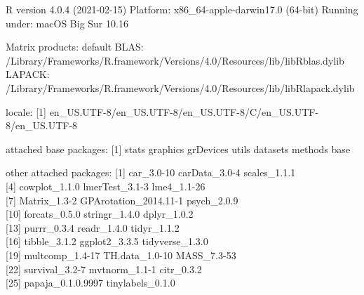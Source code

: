 \documentclass[
  english,
  man, noextraspace]{apa7}
\begin{document}
\begin{appendix}
R version 4.0.4 (2021-02-15) Platform: x86\_64-apple-darwin17.0 (64-bit)
Running under: macOS Big Sur 10.16

Matrix products: default BLAS:
/Library/Frameworks/R.framework/Versions/4.0/Resources/lib/libRblas.dylib
LAPACK:
/Library/Frameworks/R.framework/Versions/4.0/Resources/lib/libRlapack.dylib

locale: {[}1{]}
en\_US.UTF-8/en\_US.UTF-8/en\_US.UTF-8/C/en\_US.UTF-8/en\_US.UTF-8

attached base packages: {[}1{]} stats graphics grDevices utils datasets
methods base

other attached packages: {[}1{]} car\_3.0-10 carData\_3.0-4
scales\_1.1.1\\
{[}4{]} cowplot\_1.1.0 lmerTest\_3.1-3 lme4\_1.1-26\\
{[}7{]} Matrix\_1.3-2 GPArotation\_2014.11-1 psych\_2.0.9\\
{[}10{]} forcats\_0.5.0 stringr\_1.4.0 dplyr\_1.0.2\\
{[}13{]} purrr\_0.3.4 readr\_1.4.0 tidyr\_1.1.2\\
{[}16{]} tibble\_3.1.2 ggplot2\_3.3.5 tidyverse\_1.3.0\\
{[}19{]} multcomp\_1.4-17 TH.data\_1.0-10 MASS\_7.3-53\\
{[}22{]} survival\_3.2-7 mvtnorm\_1.1-1 citr\_0.3.2\\
{[}25{]} papaja\_0.1.0.9997 tinylabels\_0.1.0


\end{appendix}
\end{document}
